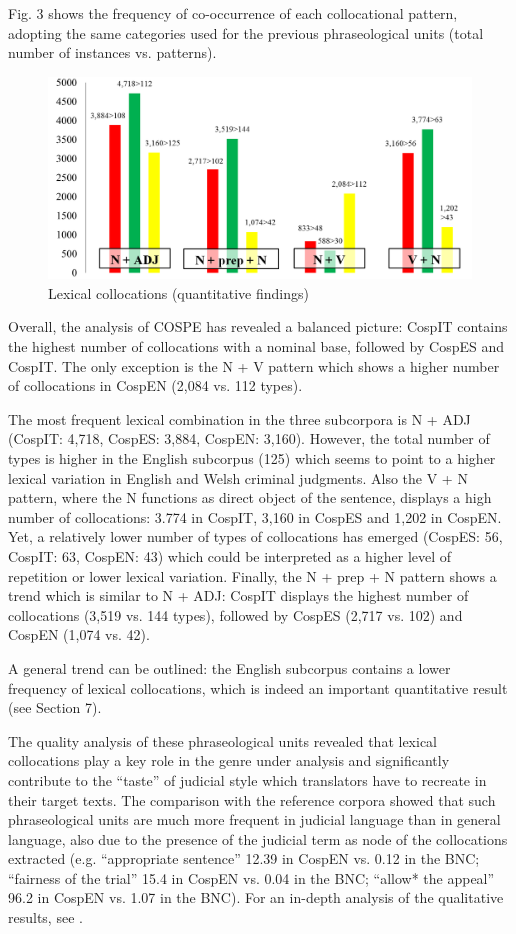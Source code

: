 \documentclass[output=paper]{LSP/langsci}
\begin{document}
Fig. 3 shows the frequency of co-occurrence of each collocational pattern, adopting the same categories used for the previous phraseological units (total number of instances vs. patterns).

\begin{figure}
\includegraphics[width=1.0\textwidth]{./figures/1-3.png}
\caption{Lexical collocations (quantitative findings)}
\end{figure}

Overall, the analysis of COSPE has revealed a balanced picture: CospIT contains the highest number of collocations with a nominal base, followed by CospES and CospIT. The only exception is the N + V pattern which shows a higher number of collocations in CospEN (2,084 vs. 112 types).

The most frequent lexical combination in the three subcorpora is N + ADJ (CospIT: 4,718, CospES: 3,884, CospEN: 3,160). However, the total number of types is higher in the English subcorpus (125) which seems to point to a higher lexical variation in English and Welsh criminal judgments. Also the V + N pattern, where the N functions as direct object of the sentence, displays a high number of collocations: 3.774 in CospIT, 3,160 in CospES and 1,202 in CospEN. Yet, a relatively lower number of types of collocations has emerged (CospES: 56, CospIT: 63, CospEN: 43) which could be interpreted as a higher level of repetition or lower lexical variation. Finally, the N + prep + N pattern shows a trend which is similar to N + ADJ: CospIT displays the highest number of collocations (3,519 vs. 144 types), followed by CospES (2,717 vs. 102) and CospEN (1,074 vs. 42).

A general trend can be outlined: the English subcorpus contains a lower frequency of lexical collocations, which is indeed an important quantitative result (see Section 7).

The quality analysis of these phraseological units revealed that lexical collocations play a key role in the genre under analysis and significantly contribute to the “taste” of judicial style which translators have to recreate in their target texts. The comparison with the reference corpora showed that such phraseological units are much more frequent in judicial language than in general language, also due to the presence of the judicial term as node of the collocations extracted (e.g. “appropriate sentence” 12.39 in CospEN vs. 0.12 in the BNC; “fairness of the trial” 15.4 in CospEN vs. 0.04 in the BNC; “allow* the appeal” 96.2 in CospEN vs. 1.07 in the BNC). For an in-depth analysis of the qualitative results, see \citep[241-252][]{Pontrandolfo2013a}.
\end{document}
